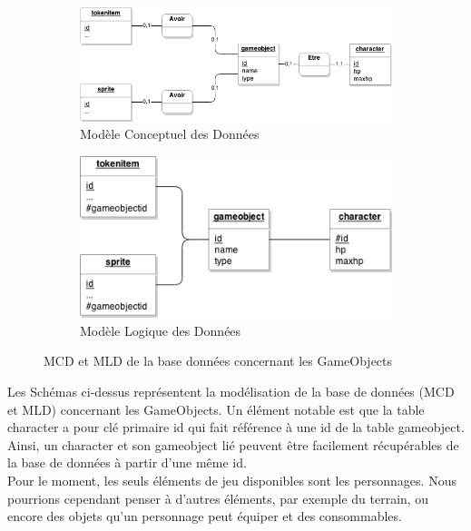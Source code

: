 \begin{figure}[h!]
        \centering
        \begin{subfigure}[h!]{0.7\textwidth}
                \includegraphics[width=\textwidth]{img/gameobject_MCD.png}
                \caption{Modèle Conceptuel des Données}
        \end{subfigure}

        \begin{subfigure}[h!]{0.5\textwidth}
                \includegraphics[width=\textwidth]{img/gameobject_MLD.png}
                \caption{Modèle Logique des Données}
        \end{subfigure}
        \caption{MCD et MLD de la base données concernant les GameObjects}
        \label{fig:GameObjectsBDD}
\end{figure}

\newpage

Les Schémas ci-dessus représentent la modélisation de la base de données (MCD et MLD) concernant les GameObjects. Un élément notable est que la table character a pour clé primaire id qui fait référence à une id de la table gameobject. Ainsi, un character et son gameobject lié peuvent être facilement récupérables de la base de données à partir d'une même id.\\

Pour le moment, les seuls éléments de jeu disponibles sont les personnages. Nous pourrions cependant penser à d'autres éléments, par exemple du terrain, ou encore des objets qu'un personnage peut équiper et des consommables.\\